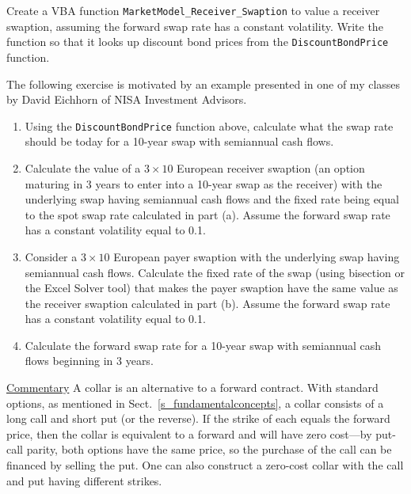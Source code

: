 \begin{prob}
\end{prob}\begin{prob} Create a VBA function \verb!MarketModel_Receiver_Swaption! to value a receiver swaption, assuming the forward swap rate has a constant volatility.  Write the function so that it looks up discount bond prices from the \verb!DiscountBondPrice! function.
\end{prob}\begin{prob} \label{e_eicchorn} The following exercise is motivated by an example presented in one of my classes by David Eichhorn of NISA Investment Advisors.
\begin{enumerate}\renewcommand{\labelenumi}{(\alph{enumi})}
\item Using the \verb!DiscountBondPrice! function above, calculate what the swap rate should be today for a 10-year swap with semiannual cash flows.
\item Calculate the value of a $ 3 \times 10$ European receiver swaption (an option maturing in 3 years to enter into a 10-year swap as the receiver) with the underlying swap having semiannual cash flows and the fixed rate being equal to the spot swap rate calculated in part (a).  Assume the forward swap rate has a constant volatility equal to 0.1.
\item Consider a $ 3 \times 10$ European payer swaption  with the underlying swap having semiannual cash flows.  Calculate the fixed rate of the swap (using bisection or the Excel Solver tool) that makes the payer swaption have the same value as the receiver swaption calculated in part (b).  Assume the forward swap rate has a constant volatility equal to 0.1.
\item 
Calculate the forward swap rate for a 10-year swap with semiannual cash flows beginning in 3 years.
\end{enumerate}
\underline{Commentary}
\next 
A collar is an alternative to a forward contract.  With standard options, as mentioned in Sect.~\ref{s_fundamentalconcepts}, a collar consists of a long call and short put (or the reverse).  If the strike of each equals the forward price, then the collar is equivalent to a  forward and will have zero cost---by put-call parity,  both options have the same price, so the purchase of the call can be financed by selling the put.  One can also construct a zero-cost collar with the call and put having different strikes.


\end{prob}
